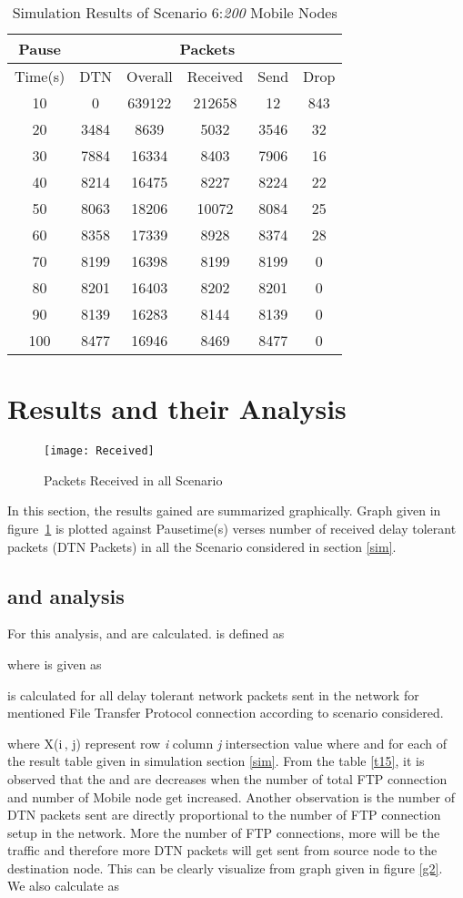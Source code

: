 \documentclass[3p,times]{elsarticle}
\begin{document}
\begin{table}[t!]
\caption{Simulation Results of Scenario 6:\emph{200} Mobile Nodes}
\label{t14}
\centering
\begin{tabular}{|c|c|c|c|c|c|}
\hline
Pause  & \multicolumn{5}{c|}{Packets} \\
\hline
Time(s) & DTN   & Overall & Received & Send & Drop \\
\hline
10 & 0 & 639122 & 212658 & 12 & 843\\
20 & 3484 & 8639 & 5032 & 3546 & 32\\
30 & 7884 & 16334 & 8403 & 7906 & 16\\
40 & 8214 & 16475 & 8227 & 8224 & 22\\
50 & 8063 & 18206 & 10072 & 8084 & 25\\
60 & 8358 & 17339 & 8928 & 8374 & 28\\
70 & 8199 & 16398 & 8199 & 8199 & 0\\
80 & 8201 & 16403 & 8202 & 8201 & 0\\
90 & 8139 & 16283 & 8144 & 8139 & 0\\
100 & 8477 & 16946 & 8469 & 8477 & 0\\
\hline
\end{tabular}
\end{table}

\section{Results and their Analysis} \label{res}
\begin{figure}[h]
\centering
\mbox{\texttt{[image: Received]}}
\caption{Packets Received in all Scenario}
\label{g1}
\end{figure}
In this section, the results gained are summarized graphically. Graph given in figure~\ref {g1} is plotted against Pausetime(s) verses number of received delay tolerant packets (DTN Packets) in all the Scenario considered in section \ref{sim}. 
\subsection{ and  analysis}
For this analysis,  and  are calculated.   is defined as 

where  is given as 


 is calculated for all delay tolerant network packets sent in the network for mentioned File Transfer Protocol connection according to scenario considered. 

where X(i\,, j) represent row \emph{i} column \emph{j} intersection value where  and  for each of the result table given in simulation section \ref{sim}.
From the table \ref{t15}, it is observed that the  and   are decreases when the number of total FTP connection and number of Mobile node get increased. Another observation is the number of DTN packets sent are directly proportional to the number of FTP connection setup in the network. More the number of FTP connections, more will be the traffic and therefore more DTN packets will get sent from source node to the destination node. This can be clearly visualize from graph given in figure \ref{g2}. \\
We also calculate  as 
\end{document}
